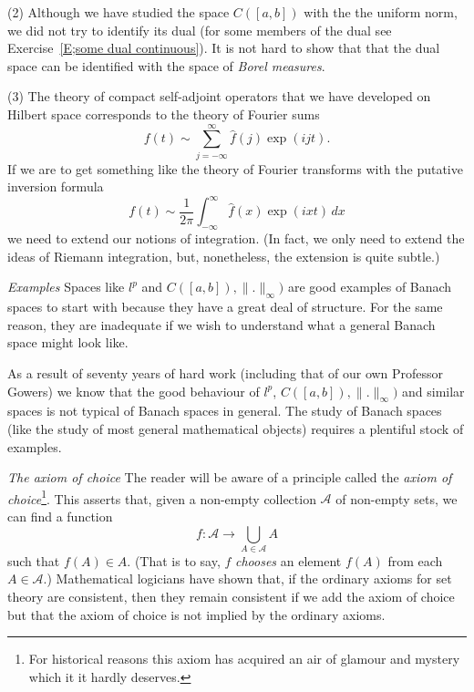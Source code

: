 (2) Although we have studied the space $C([a,b])$ with
the the uniform norm, we did not try to identify its dual
(for some members of the dual see Exercise~\ref{E;some dual continuous}).
It is not hard to show that that the dual space can be
identified with the space of \emph{Borel measures}.

(3) The theory of compact self-adjoint operators that
we have developed on Hilbert space corresponds to
the theory of Fourier sums
\[f(t)\sim\sum_{j=-\infty}^{\infty}\hat{f}(j)\exp(ijt).\]
If we are to get something like the theory of Fourier
transforms with the putative inversion formula
\[f(t)\sim\frac{1}{2\pi}\int_{-\infty}^{\infty}\hat{f}(x)\exp(ixt)\,dx\]
we need to extend our notions of integration.
(In fact, we only need to extend the ideas of Riemann integration,
but, nonetheless, the extension is quite subtle.)

\noindent\emph{Examples} Spaces like $l^{p}$ and 
$C([a,b]),\|.\|_{\infty})$ are good examples of Banach spaces
to start with because they have a great deal of structure.
For the same reason, they are inadequate if we wish to
understand what a general Banach space might look like.

As a result of seventy years of hard work 
(including that of our own Professor Gowers)
we know that the good behaviour of $l^{p}$,
$C([a,b]),\|.\|_{\infty})$ and similar spaces
is not typical of Banach spaces in general. 
The study of Banach spaces (like the study of
most general mathematical objects) requires 
a plentiful stock of examples.

\noindent\emph{The axiom of choice} The reader will be aware
of a principle called the \emph{axiom of choice}\footnote{For
historical reasons this axiom has acquired an air of glamour and mystery
which it it hardly deserves.}.
This asserts that, given a non-empty collection ${\mathcal A}$
of non-empty sets, we can find a function
\[f:{\mathcal A}\rightarrow\bigcup_{A\in{\mathcal A}}A\]
such that $f(A)\in A$. (That is to say, $f$ \emph{chooses}
an element $f(A)$ from each $A\in{\mathcal A}$.)
Mathematical logicians have shown that, if the ordinary
axioms for set theory are consistent, then they remain
consistent if we add the axiom of choice but that the
axiom of choice is not implied by the ordinary axioms.

